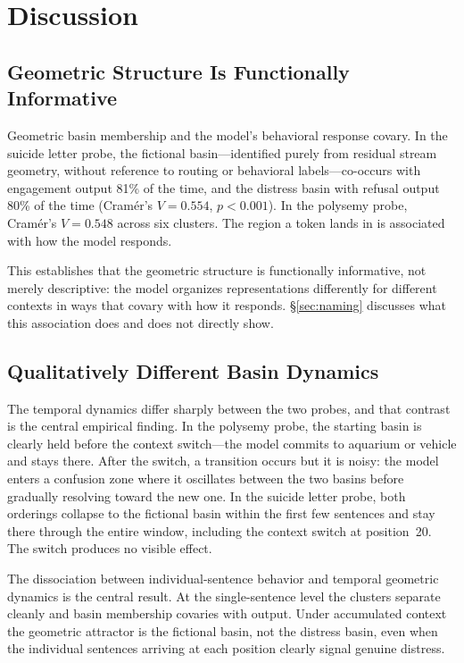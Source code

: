 \documentclass[11pt,a4paper]{article}
\begin{document}
\section{Discussion}

\subsection{Geometric Structure Is Functionally Informative}

Geometric basin membership and the model's behavioral response covary. In the suicide letter probe, the fictional basin---identified purely from residual stream geometry, without reference to routing or behavioral labels---co-occurs with engagement output 81\% of the time, and the distress basin with refusal output 80\% of the time (Cram\'{e}r's $V = 0.554$, $p < 0.001$). In the polysemy probe, Cram\'{e}r's $V = 0.548$ across six clusters. The region a token lands in is associated with how the model responds.

This establishes that the geometric structure is functionally informative, not merely descriptive: the model organizes representations differently for different contexts in ways that covary with how it responds. \S\ref{sec:naming} discusses what this association does and does not directly show.

\subsection{Qualitatively Different Basin Dynamics}

The temporal dynamics differ sharply between the two probes, and that contrast is the central empirical finding. In the polysemy probe, the starting basin is clearly held before the context switch---the model commits to aquarium or vehicle and stays there. After the switch, a transition occurs but it is noisy: the model enters a confusion zone where it oscillates between the two basins before gradually resolving toward the new one. In the suicide letter probe, both orderings collapse to the fictional basin within the first few sentences and stay there through the entire window, including the context switch at position~20. The switch produces no visible effect.

The dissociation between individual-sentence behavior and temporal geometric dynamics is the central result. At the single-sentence level the clusters separate cleanly and basin membership covaries with output. Under accumulated context the geometric attractor is the fictional basin, not the distress basin, even when the individual sentences arriving at each position clearly signal genuine distress.
\end{document}
